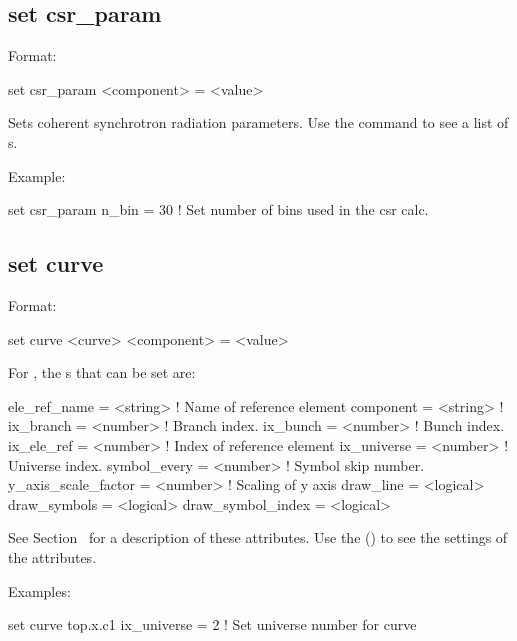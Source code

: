 {{\subsection{set csr_param}
\label{s:set.csr.param}

Format:
\begin{example}
  set csr_param <component> = <value>
\end{example}


Sets coherent synchrotron radiation parameters. Use the 
command to see a list of s.

Example:
\begin{example}
  set csr_param n_bin = 30  ! Set number of bins used in the csr calc.
\end{example}


\subsection{set curve}
\label{s:set.curve}

Format:
\begin{example}
  set curve <curve> <component> = <value>
\end{example}


For , the s that can be set are:
\begin{example}
  ele_ref_name        = <string>  ! Name of reference element
  component           = <string>  ! 
  ix_branch           = <number>  ! Branch index.
  ix_bunch            = <number>  ! Bunch index.
  ix_ele_ref          = <number>  ! Index of reference element
  ix_universe         = <number>  ! Universe index.
  symbol_every        = <number>  ! Symbol skip number.
  y_axis_scale_factor = <number>  ! Scaling of y axis
  draw_line           = <logical> 
  draw_symbols        = <logical> 
  draw_symbol_index   = <logical> 
\end{example}
See Section~ for a description of these attributes.  Use the  () to see the settings of the attributes.

Examples:
\begin{example}
  set curve top.x.c1 ix_universe = 2  ! Set universe number for curve
\end{example}


}}
